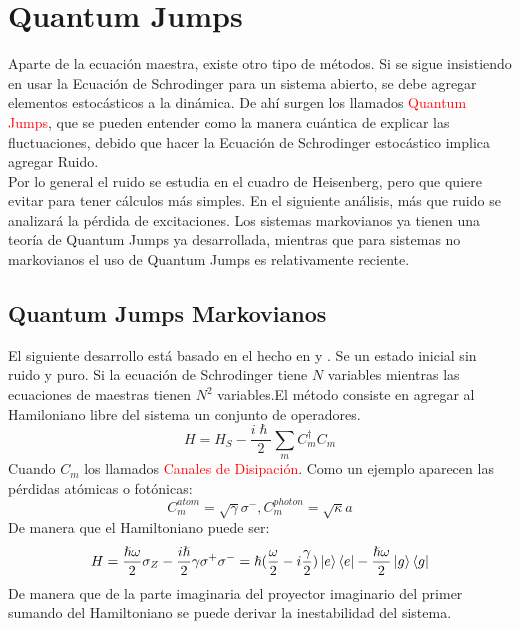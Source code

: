\documentclass{book}
\begin{document}
\chapter{Quantum Jumps}
Aparte de la ecuación maestra, existe otro tipo de métodos. Si se sigue insistiendo en usar la Ecuación de Schrodinger para un sistema abierto, se debe agregar elementos estocásticos a la dinámica. De ahí surgen los llamados \textcolor{red}{Quantum Jumps}, que se pueden entender como la manera cuántica de explicar las fluctuaciones, debido que hacer la Ecuación de Schrodinger estocástico implica agregar Ruido. \\

Por lo general el ruido se estudia en el cuadro de Heisenberg, pero que quiere evitar para tener cálculos más simples. En el siguiente análisis, más que ruido se analizará la pérdida de excitaciones. Los sistemas markovianos ya tienen una teoría de Quantum Jumps ya desarrollada, mientras que para sistemas no markovianos el uso de Quantum Jumps es relativamente reciente. 
\section{Quantum Jumps Markovianos}
El siguiente desarrollo está basado en el hecho en  \cite{Carmichael} y \cite{Orszag2}. Se un estado inicial sin ruido y puro. Si la ecuación de Schrodinger tiene $N$ variables mientras las ecuaciones de maestras tienen $N^2$ variables.El método consiste en agregar al Hamiloniano libre del sistema un conjunto de operadores.
\begin{equation}\label{eq5.1}H=H_S-\frac{i\hslash}{2}\sum_m C_m^\dag C_m\end{equation}
Cuando  $C_m$ los llamados \textcolor{red}{Canales de Disipación}. Como un ejemplo aparecen las pérdidas atómicas o fotónicas:
\begin{equation}\label{eq5.2}C_m^{atom}=\sqrt{\gamma}\sigma^-, C_m^{photon}=\sqrt{\kappa}a\end{equation} De manera que el Hamiltoniano puede ser:
\begin{equation}\label{eq5.3}H=\frac{\hslash\omega}{2}\sigma_Z-\frac{i\hslash}{2}\gamma\sigma^+\sigma^-=\hslash(\frac{\omega}{2}-i\frac{\gamma}{2})\ket{e}\bra{e}-\frac{\hslash\omega}{2}\ket{g}\bra{g}\end{equation}
De manera que de la parte imaginaria del proyector imaginario del primer sumando del Hamiltoniano se puede derivar la inestabilidad del sistema.\\
\end{document}

